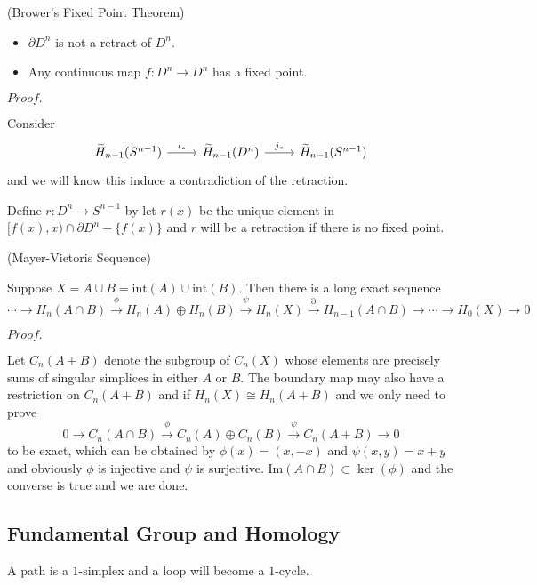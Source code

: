 \documentclass{article}
\newcommand{\Pf}[1]{$Proof.$\par}
\begin{document}
\begin{theorem}(Brower's Fixed Point Theorem)\par
    \begin{itemize}
        \item $\partial D^n$ is not a retract of $D^n$.
        \item Any continuous map $f:D^n \to D^n$ has a fixed point.
    \end{itemize}
\end{theorem}
\Pf\par
    Consider
    \[
    \begin{tikzcd}
        \widetilde{H}_{n-1}(S^{n-1})\arrow[r,"\iota_*"] & \widetilde{H}_{n-1}(D^{n})\arrow[r,"j_*"] & \widetilde{H}_{n-1}(S^{n-1})
    \end{tikzcd}
    \]
    and we will know this induce a contradiction of the retraction.\par
    Define $r:D^n \to S^{n-1}$ by let $r(x)$ be the unique element in $[f(x),x)\cap \partial D^n - \{f(x)\}$ and $r$ will be a retraction if there is no fixed point.

\begin{theorem}(Mayer-Vietoris Sequence)\par
    Suppose $X = A\cup B = \text{int}(A)\cup \text{int}(B)$. Then there is a long exact sequence
    \[
    \cdots \to H_n(A\cap B) \overset{\phi}{\to} H_n(A)\oplus H_n(B) \overset{\psi}{\to} H_n(X) \overset{\partial}{\to} H_{n-1}(A\cap B) \to \cdots \to H_0(X) \to 0
    \]
\end{theorem}
\Pf\par
    Let $C_n(A+B)$ denote the subgroup of $C_n(X)$ whose elements are precisely sums of singular simplices in either $A$ or $B$. The boundary map may also have a restriction on $C_n(A+B)$ and if $H_n(X) \cong H_n(A+B)$ and we only need to prove
    \[
    0 \to C_n(A\cap B) \overset{\phi}{\to} C_n(A)\oplus C_n(B) \overset{\psi}{\to} C_n(A+B) \to 0
    \]
    to be exact, which can be obtained by $\phi(x) = (x,-x)$ and $\psi(x,y) = x+y$ and obviously $\phi$ is injective and $\psi$ is surjective. $\text{Im}(A\cap B) \subset \ker(\phi)$ and the converse is true and we are done.

\subsection{Fundamental Group and Homology}

A path is a $1$-simplex and a loop will become a $1$-cycle.
\end{document}
